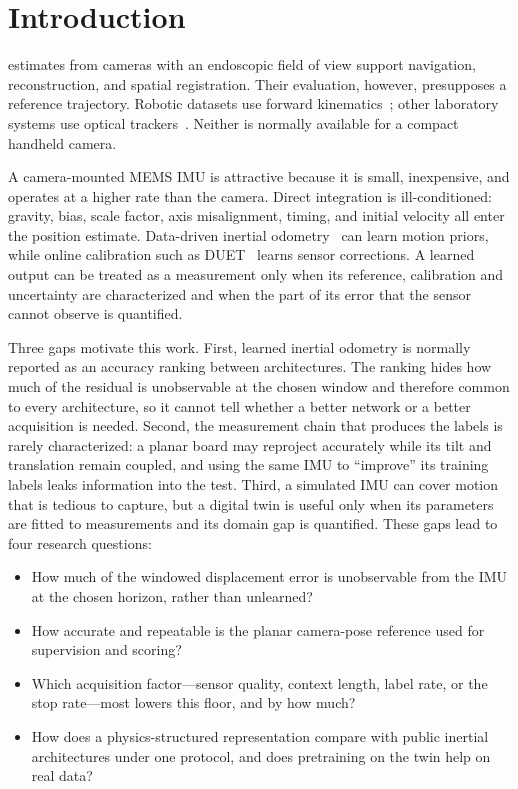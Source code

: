 \section{Introduction}

 estimates from cameras with an endoscopic field of
view support navigation, reconstruction, and spatial registration. Their
evaluation, however, presupposes a reference trajectory. Robotic datasets use
forward kinematics~\cite{hayoz2023pose}; other laboratory systems use optical
trackers~\cite{hartwig2022constrained}. Neither is normally
available for a compact handheld camera.

A camera-mounted MEMS IMU is attractive because it is small, inexpensive,
and operates at a higher rate than the camera. Direct integration is
ill-conditioned: gravity, bias, scale factor, axis misalignment, timing, and
initial velocity all enter the position estimate. Data-driven inertial
odometry~\cite{chen2018ionet,yan2020ronin,liu2020tlio,zeinali2024imunet} can
learn motion priors, while online calibration such as
DUET~\cite{liu2023duet} learns sensor corrections. A learned output can be
treated as a measurement only when its reference, calibration and uncertainty
are characterized and when the part of its error that the sensor cannot
observe is quantified.

Three gaps motivate this work. First, learned inertial odometry is normally
reported as an accuracy ranking between architectures. The ranking hides how
much of the residual is unobservable at the chosen window and therefore common
to every architecture, so it cannot tell whether a better network or a better
acquisition is needed. Second, the measurement chain that produces the labels
is rarely characterized: a planar board may reproject accurately while its tilt
and translation remain coupled, and using the same IMU to ``improve'' its
training labels leaks information into the test. Third, a simulated IMU can
cover motion that is tedious to capture, but a digital twin is useful only when
its parameters are fitted to measurements and its domain gap is quantified.
These gaps lead to four research questions:
\begin{itemize}
  \item[RQ1)] How much of the windowed displacement error is unobservable from
  the IMU at the chosen horizon, rather than unlearned?
  \item[RQ2)] How accurate and repeatable is the planar camera-pose reference
  used for supervision and scoring?
  \item[RQ3)] Which acquisition factor---sensor quality, context length, label
  rate, or the stop rate---most lowers this floor, and by how much?
  \item[RQ4)] How does a physics-structured representation compare with public
  inertial architectures under one protocol, and does pretraining on the twin
  help on real data?
\end{itemize}

